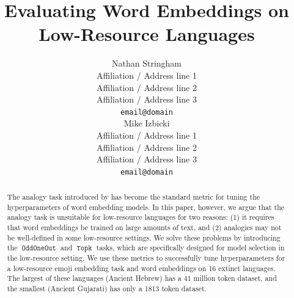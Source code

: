 \documentclass[11pt,a4paper]{article}
\title{Evaluating Word Embeddings on Low-Resource Languages}
\author{Nathan Stringham\\
  Affiliation / Address line 1 \\
  Affiliation / Address line 2 \\
  Affiliation / Address line 3 \\
  \texttt{email@domain} \\\And
  Mike Izbicki \\
  Affiliation / Address line 1 \\
  Affiliation / Address line 2 \\
  Affiliation / Address line 3 \\
  \texttt{email@domain} \\}
\date{}
\DeclareMathOperator{\OddOneOut}{\texttt{OddOneOut}}
\DeclareMathOperator{\topk}{\texttt{Topk}}
\begin{document}
\maketitle
\begin{abstract}
    The analogy task introduced by \citet{mikolov2013efficient} has become the standard metric for tuning the hyperparameters of word embedding models.
    In this paper, however, we argue that the analogy task is unsuitable for low-resource languages for two reasons: 
    (1) it requires that word embeddings be trained on large amounts of text,
    and (2) analogies may not be well-defined in some low-resource settings.
    We solve these problems by introducing the $\OddOneOut$ and $\topk$ tasks,
    which are specifically designed for model selection in the low-resource setting.
    We use these metrics to successfully tune hyperparameters for a low-resource emoji embedding task and word embeddings on 16 extinct languages.    
    The largest of these languages (Ancient Hebrew) has a 41 million token dataset, 
    and the smallest (Ancient Gujarati) has only a 1813 token dataset.


\end{abstract}
\end{document}
